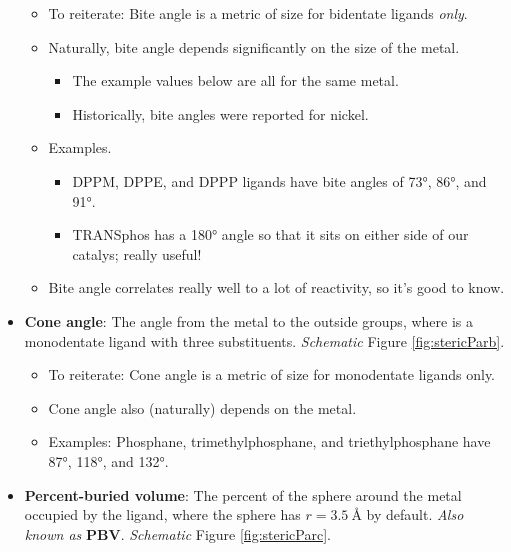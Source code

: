 \documentclass[../notes.tex]{subfiles}
\begin{document}
\begin{itemize}
\begin{itemize}
        \item To reiterate: Bite angle is a metric of size for bidentate ligands \emph{only}.
        \item Naturally, bite angle depends significantly on the size of the metal.
        \begin{itemize}
            \item The example values below are all for the same metal.
            \item Historically, bite angles were reported for nickel.
        \end{itemize}
        \item Examples.
        \begin{itemize}
            \item DPPM, DPPE, and DPPP ligands have bite angles of \ang{73}, \ang{86}, and \ang{91}.
            \item TRANSphos has a \ang{180} angle so that it sits on either side of our catalys; really useful!
        \end{itemize}
        \item Bite angle correlates really well to a lot of reactivity, so it's good to know.
    \end{itemize}
    \pagebreak
    \item \textbf{Cone angle}: The angle from the metal to the outside  groups, where  is a monodentate ligand with three substituents. \emph{Schematic} Figure \ref{fig:stericParb}.
    \begin{itemize}
        \item To reiterate: Cone angle is a metric of size for monodentate ligands only.
        \item Cone angle also (naturally) depends on the metal.
        \item Examples: Phosphane, trimethylphosphane, and triethylphosphane have \ang{87}, \ang{118}, and \ang{132}.
    \end{itemize}
    \item \textbf{Percent-buried volume}: The percent of the sphere around the metal occupied by the ligand, where the sphere has $r=\SI{3.5}{\angstrom}$ by default. \emph{Also known as} \textbf{PBV}. \emph{Schematic} Figure \ref{fig:stericParc}.

\end{itemize}
\end{document}
